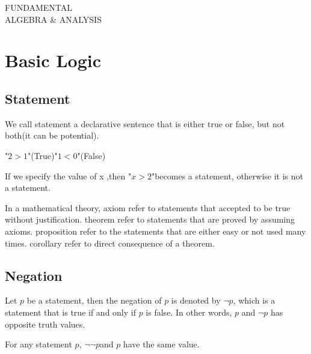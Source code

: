 \documentclass{book}
\numberwithin{equation}{section}
\begin{document}
\setlength{\parindent}{0em}
\begin{box3}
        \begin{center}
            \Huge 
    FUNDAMENTAL \\
    ALGEBRA \& ANALYSIS
        \end{center}
    
    \end{box3}
\thispagestyle{empty}
    \newpage
{}
\setcounter{page}{1}
\tableofcontents
\clearpage
{}
\setcounter{page}{1}




\chapter{Basic Logic}
\section{Statement}
\begin{definitionenv}
    We call statement a declarative sentence that is either true or false, but not both(it can be potential).    
\end{definitionenv}
\begin{exampleenv}
    "$2>1$"(True)\quad "$1<0$"(False)
\end{exampleenv}
If we specify the value of x ,then "$x>2$"becomes a statement, otherwise it is not a statement.
\begin{definitionenv}
    In a mathematical theory,
    \newline 
    axiom refer to statements that accepted to be true without justification.
    \newline
    theorem refer to statements that are proved by assuming axioms.
    \newline
    proposition refer to the statements that are either easy or not used many times.
    \newline
    corollary refer to direct consequence of a theorem.
\end{definitionenv}




\section{Negation}
\begin{definitionenv}
    Let $p$ be a statement, then the negation of $p$ is denoted by $\neg p$, which is a statement that is true if and only if $p$ is false.
    In other words, $p$ and $\neg p$ has opposite truth values.
\end{definitionenv}
\begin{propositionenv}
For any statement $p$, $\neg \neg p$and $p$ have the same value.
\end{propositionenv}
\end{document}
